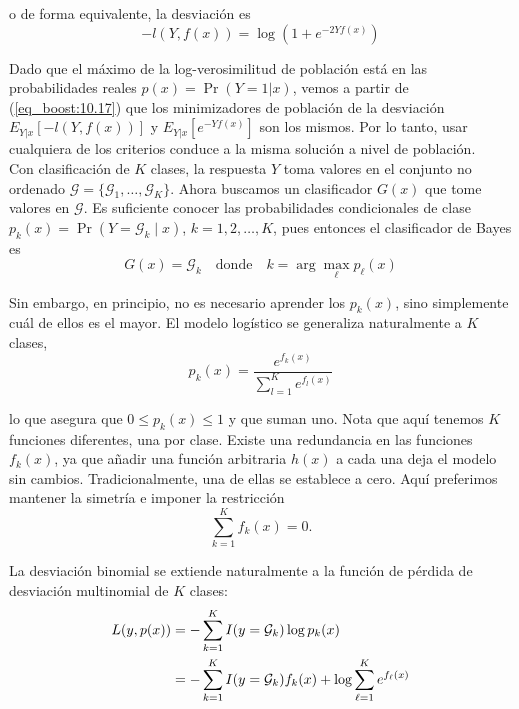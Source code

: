\noindent o de forma equivalente, la desviación es
\begin{equation}
-l(Y,f(x)) = \log\left(1 + e^{-2Y f(x)}\right)
\end{equation}

Dado que el máximo de la log-verosimilitud de población está en las probabilidades reales $p(x) = \Pr(Y = 1 | x)$, vemos a partir de (\ref{eq_boost:10.17}) que los minimizadores de población de la desviación $E_{Y|x}[-l(Y,f(x))]$ y $E_{Y|x}[e^{-Y f(x)}]$ son los mismos. Por lo tanto, usar cualquiera de los criterios conduce a la misma solución a nivel de población. \\

Con clasificación de $K$ clases, la respuesta $Y$ toma valores en el conjunto no ordenado $\mathcal{G} = \{\mathcal{G}_1, \dots, \mathcal{G}_K\}$. Ahora buscamos un clasificador $G(x)$ que tome valores en $\mathcal{G}$. Es suficiente conocer las probabilidades condicionales de clase $p_k(x) = \Pr(Y = \mathcal{G}_k \mid x)$, $k = 1,2,\dots,K$, pues entonces el clasificador de Bayes es
\begin{equation}
G(x) = \mathcal{G}_k \quad \text{donde} \quad k = \arg\max_\ell p_\ell(x)
\label{eq_boost:10.20}
\end{equation}

Sin embargo, en principio, no es necesario aprender los $p_k(x)$, sino simplemente cuál de ellos es el mayor. El modelo logístico se generaliza naturalmente a $K$ clases,
\begin{equation}
p_k(x) = \frac{e^{f_k(x)}}{\sum_{l=1}^{K} e^{f_l(x)}}
\label{eq_boost:10.21}
\end{equation}

\noindent lo que asegura que $0 \leq p_k(x) \leq 1$ y que suman uno. Nota que aquí tenemos $K$ funciones diferentes, una por clase. Existe una redundancia en las funciones $f_k(x)$, ya que añadir una función arbitraria $h(x)$ a cada una deja el modelo sin cambios. Tradicionalmente, una de ellas se establece a cero. Aquí preferimos mantener la simetría e imponer la restricción
\begin{equation}
\sum_{k=1}^{K} f_k(x) = 0.
\end{equation}

La desviación binomial se extiende naturalmente a la función de pérdida de desviación multinomial de $K$ clases:
\begin{align}
L(y, p(x)) &= -\sum_{k=1}^{K} I(y = \mathcal{G}_k) \log p_k(x) \notag \\ 
&= -\sum_{k=1}^{K} I(y = \mathcal{G}_k) f_k(x) + \log \sum_{\ell=1}^{K} e^{f_\ell(x)}
\label{eq_boost:10.22}
\end{align}

